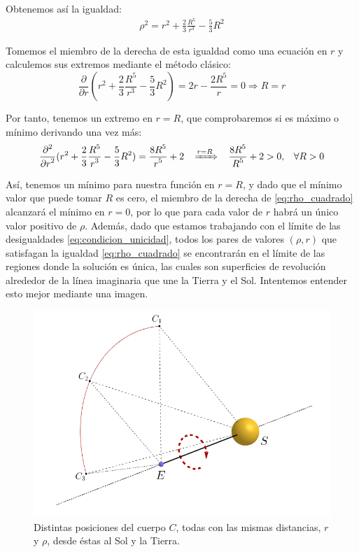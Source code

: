 \documentclass[11pt]{book}
\newcommand\ddfrac[2]{\frac{\displaystyle #1}{\displaystyle #2}}
\begin{document}
Obtenemos así la igualdad:
\begin{align}
\rho^2=r^2+\ddfrac{2}{3}\ddfrac{R^5}{r^3}-\ddfrac{5}{3}R^2
\label{eq:rho_cuadrado}
\end{align}

Tomemos el miembro de la derecha de esta igualdad como una ecuación en $r$ y calculemos sus extremos mediante el método clásico:
\[
\ddfrac{\partial}{\partial r} (r^2+\ddfrac{2}{3}\ddfrac{R^5}{r^3}-\ddfrac{5}{3}R^2)=2r-\ddfrac{2R^5}{r}=0 \Longrightarrow R=r
\]

Por tanto, tenemos un extremo en $r=R$, que comprobaremos si es máximo o mínimo derivando una vez más:
\[
\ddfrac{\partial^2}{\partial r^2}(r^2+\ddfrac{2}{3}\ddfrac{R^5}{r^3}-\ddfrac{5}{3}R^2)=\ddfrac{8R^5}{r^5}+2
 \; \; \; \xRightarrow[]{r=R} \; \; \; \ddfrac{8R^5}{R^5}+2>0, \; \; \; \forall R>0
\]

Así, tenemos un mínimo para nuestra función en $r=R$, y dado que el mínimo valor que puede tomar $R$ es cero, el miembro de la derecha de \eqref{eq:rho_cuadrado} alcanzará el mínimo en $r=0$, por lo que para cada valor de $r$ habrá un único valor positivo de $\rho$. Además, dado que estamos trabajando con el límite de las desigualdades \eqref{eq:condicion_unicidad}, todos los pares de valores $(\rho,r)$ que satisfagan la igualdad \eqref{eq:rho_cuadrado} se encontrarán en el límite de las regiones donde la solución es única, las cuales son superficies de revolución alrededor de la línea imaginaria que une la Tierra y el Sol. Intentemos entender esto mejor mediante una imagen.
\begin{figure}[H]
\centering
\includegraphics[scale=0.4]{images/eje_rotacion.png}
\caption{Distintas posiciones del cuerpo $C$, todas con las mismas distancias, $r$ y $\rho$, desde éstas al Sol y la Tierra.}
\label{fig:eje_rotacion}
\end{figure}
\end{document}
